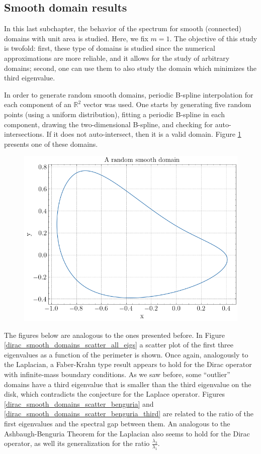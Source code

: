 \subsection{Smooth domain results}

In this last subchapter, the behavior of the spectrum for smooth (connected) domains with unit area is studied. Here, we fix \(m=1\). The objective of this study is twofold: first, these type of domains is studied since the numerical approximations are more reliable, and it allows for the study of arbitrary domains; second, one can use them to also study the domain which minimizes the third eigenvalue.

In order to generate random smooth domains, periodic B-spline interpolation for each component of an \(\mathbb{R}^2\) vector was used. One starts by generating five random points (using a uniform distribution), fitting a periodic B-spline in each component, drawing the two-dimensional B-spline, and checking for auto-intersections. If it does not auto-intersect, then it is a valid domain. Figure \ref{dirac_smooth_random_domain} presents one of these domains.

\begin{figure}[!htb]
    \centering
    \includegraphics[width=0.55\linewidth]{Images/Dirac/smooth/random_smooth_domain.png}
    \label{dirac_smooth_random_domain}
\end{figure}

The figures below are analogous to the ones presented before. In Figure \ref{dirac_smooth_domains_scatter_all_eigs} a scatter plot of the first three eigenvalues as a function of the perimeter is shown. Once again, analogously to the Laplacian, a Faber-Krahn type result appears to hold for the Dirac operator with infinite-mass boundary conditions. As we saw before, some ``outlier'' domains have a third eigenvalue that is smaller than the third eigenvalue on the disk, which contradicts the conjecture for the Laplace operator.
Figures \ref{dirac_smooth_domains_scatter_benguria} and \ref{dirac_smooth_domains_scatter_benguria_third} are related to the ratio of the first eigenvalues and the spectral gap between them. An analogous to the Ashbaugh-Benguria Theorem for the Laplacian also seems to hold for the Dirac operator, as well its generalization for the ratio \(\frac{\lambda_3}{\lambda_1}\).

